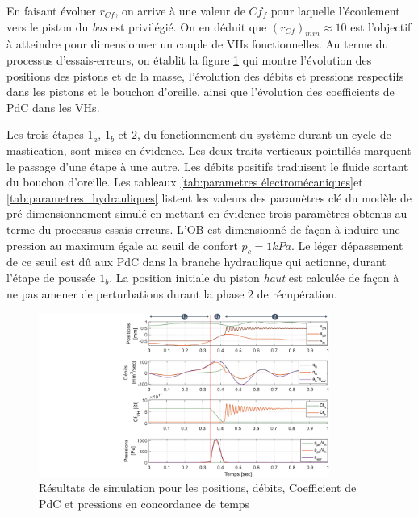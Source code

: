 En faisant évoluer $r_{Cf}$, on arrive à une valeur de $Cf_f$ pour laquelle l'écoulement vers le piston du \emph{bas} est privilégié. On en déduit que $(r_{Cf})_{min}\approx 10$ est l'objectif à atteindre pour dimensionner un couple de VHs fonctionnelles. Au terme du processus d'essais-erreurs, on établit la figure \ref{fig:simu_pos_debit_Cf_pression_1CYCLE} qui montre l'évolution des positions des pistons et de la masse, l'évolution des débits et pressions respectifs dans les pistons et le bouchon d'oreille, ainsi que l'évolution des coefficients de PdC dans les VHs.

Les trois étapes $1_a$, $1_b$ et $2$, du fonctionnement du système durant un cycle de mastication, sont mises en évidence. Les deux traits verticaux pointillés marquent le passage d'une étape à une autre. Les débits positifs traduisent le fluide sortant du bouchon d'oreille. Les tableaux \ref{tab:parametres électromécaniques}et \ref{tab:parametres_hydrauliques} listent les valeurs des paramètres clé du modèle de pré-dimensionnement simulé en mettant en évidence trois paramètres obtenus au terme du processus essais-erreurs. L'OB est dimensionné de façon à induire une pression au maximum égale au seuil de confort $p_c=1kPa$. Le léger dépassement de ce seuil est dû aux PdC dans la branche hydraulique qui actionne, durant l'étape de poussée $1_b$. La position initiale du piston \emph{haut} est calculée de façon à ne pas amener de perturbations durant la phase $2$ de récupération.
\begin{figure}[!ht]
\begin{center}
    \captionsetup{justification=centering}
	\includegraphics[trim={9.8cm 0cm 0cm 0cm},clip,width=0.85\textwidth]{../Chap2/Figure/simu_pos_debit_Cf_pression_1CYCLE.pdf}
	\caption{Résultats de simulation pour les positions, débits, Coefficient de PdC et pressions en concordance de temps}
	\label{fig:simu_pos_debit_Cf_pression_1CYCLE}
\end{center}	
\end{figure}

